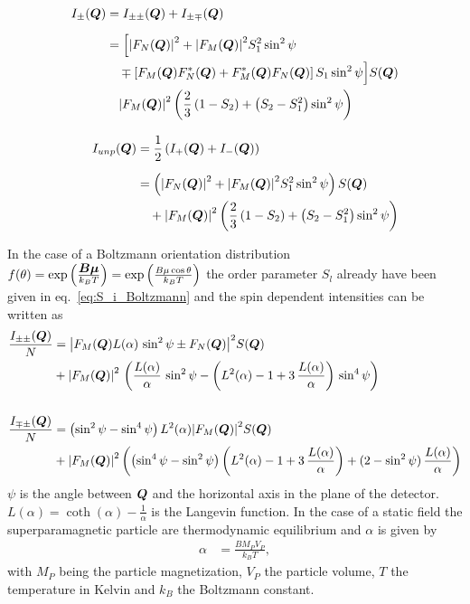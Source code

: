 \begin{subequations} \label{eq:I_iSQ_I_unpSQ}
\begin{align}
\begin{split}
    I_{\pm}(\BM{Q}) &= I_{\pm\pm}(\BM{Q})+I_{\pm\mp}(\BM{Q}) \\[2mm]
                    &= \Bigl[\abs{F_N(\BM{Q})}^2 + \abs{F_M(\BM{Q})}^2S_1^2\sin^2\psi \\
                    & \quad  \mp \left[F_M(\BM{Q})F^*_N(\BM{Q})+F^*_M(\BM{Q})F_N(\BM{Q})\right]S_1\sin^2\psi\Bigr] S(\BM{Q}) \\
                    & \quad \abs{F_M(\BM{Q})}^2\left(\frac{2}{3}\left(1-S_2\right)+\left(S_2-S_1^2\right)\sin^2\psi \right)
\end{split} \\[3mm]
\begin{split}
    I_{unp}(\BM{Q}) &= \frac{1}{2}\left(I_{+}(\BM{Q})+I_{-}(\BM{Q})\right)\\[2mm]
                    &=  \left(\abs{F_N(\BM{Q})}^2 + \abs{F_M(\BM{Q})}^2S_1^2\sin^2\psi\right) S(\BM{Q}) \\
                    & \quad + \abs{F_M(\BM{Q})}^2\left(\frac{2}{3}\left(1-S_2\right)+\left(S_2-S_1^2\right)\sin^2\psi\right)
\end{split}
\end{align}
\end{subequations}

In the case of a Boltzmann orientation distribution
$f(\theta)=\exp\left(\frac{\BM{B\mu}}{k_BT}\right)=\exp\left(\frac{B\mu\cos\theta}{k_BT}\right)$
the order parameter $S_l$ already have been given in eq.\ \ref{eq:S_i_Boltzmann}
and the spin dependent intensities can be written as
\begin{subequations}
\begin{align}
\frac{I_{\pm\pm}(\BM{Q})}{N} &=
\abs{F_M(\BM{Q}) L(\alpha)\,\sin^2\psi
     \pm F_N(\BM{Q})}^2 S(\BM{Q}) \\
&+
\abs{F_M(\BM{Q})}^2\, \left( \frac{L(\alpha)}{\alpha}\,
\sin^2\psi - \left( L^2(\alpha)-1+3\,\frac{L(\alpha)}{\alpha}\right)
\, \sin^4\psi \right) \nonumber \\
\nonumber \\
\frac{I_{\mp\pm}(\BM{Q})}{N} &=
\left( \sin^2\psi - \sin^4\psi \right)
L^2(\alpha)
\abs{F_M(\BM{Q})}^2 S(\BM{Q}) \\
&+
\abs{F_M(\BM{Q})}^2  \left( \left( \sin^4\psi-\sin^2\psi \right)
\left( L^2(\alpha)-1+3\, \frac{L(\alpha)}{\alpha}\right) +
(2-\sin^2\psi)\, \frac{L(\alpha)}{\alpha}\right) \nonumber
\end{align}
\end{subequations}
$\psi$ is the angle between $\BM{Q}$ and the horizontal axis in the plane of the detector.
$L(\alpha)=\coth(\alpha)-\frac{1}{\alpha}$ is the Langevin function. In the case of a static field
the superparamagnetic particle are thermodynamic equilibrium and $\alpha$ is given by
\begin{align}
\alpha&=\frac{BM_PV_P}{k_B T},
\end{align}
with $M_P$ being the particle magnetization, $V_P$ the particle volume,
$T$ the temperature in Kelvin and $k_B$ the Boltzmann constant.

